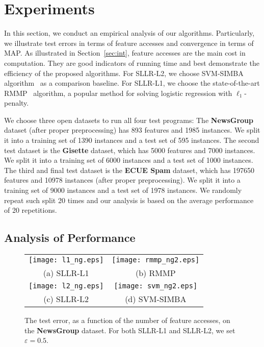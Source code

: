 \documentclass{llncs}
\begin{document}
\section{Experiments} \label{sec:experiment}

In this section, we conduct an empirical analysis of our algorithms.
Particularly, we illustrate test errors in terms of feature accesses and convergence in terms of MAP.
As illustrated in Section~\ref{sec:int}, feature accesses are the main cost in computation.
They are good indicators of running time and best demonstrate the efficiency of the proposed algorithms.
For SLLR-L2, we choose SVM-SIMBA algorithm~\cite{hazanbeating} as a comparison baseline.
For SLLR-L1, we choose the state-of-the-art RMMP~\cite{balakrishnan2008algorithms} algorithm, a popular method for solving logistic regression with $\ell_1$-penalty.
	
We choose three open datasets to run all four test programs:	
The	\textbf{NewsGroup} dataset (after proper preprocessing) has 893 features and 1985 instances. We split it into a training set of 1390 instances and a test set of 595 instances.	
The	second test dataset is the \textbf{Gisette} \cite{guyon2004result} dataset, which has 5000 features and 7000 instances. We split it into a training set of 6000 instances and a test set of 1000 instances. 
The	third and final test dataset is the \textbf{ECUE Spam} \cite{DelanyKBS05} dataset, which has 197650 features and 10978 instances (after proper preprocessing). We split it into a training set of 9000 instances and a test set of 1978 instances.
We randomly repeat such split 20 times and our analysis is based on the average performance of 20 repetitions.

\subsection{Analysis of Performance}

\begin{figure}[ht] \label{fig:01}
    \begin{tabular}{cc}
\hspace{-0.3cm}	\texttt{[image: l1\_ng.eps]}
&\hspace{-0.6cm}	\texttt{[image: rmmp\_ng2.eps]} \\
(a) SLLR-L1 & (b) RMMP \\
\hspace{-0.3cm}	\texttt{[image: l2\_ng.eps]}
&\hspace{-0.6cm}	\texttt{[image: svm\_ng2.eps]}
	\\
	(c)  SLLR-L2 & (d)  SVM-SIMBA \\
	\end{tabular}
\caption{The test error, as a function of the number of feature accesses, on the \textbf{NewsGroup} dataset. For both SLLR-L1 and SLLR-L2, we set $\varepsilon=0.5$.}
\end{figure}
\end{document}
